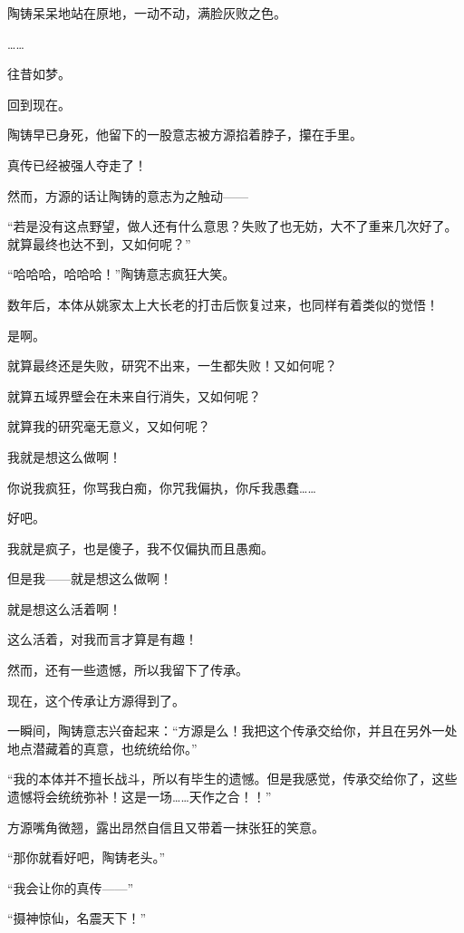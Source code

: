 \begin{this_body}
陶铸呆呆地站在原地，一动不动，满脸灰败之色。

……

往昔如梦。

回到现在。

陶铸早已身死，他留下的一股意志被方源掐着脖子，攥在手里。

真传已经被强人夺走了！

然而，方源的话让陶铸的意志为之触动——

“若是没有这点野望，做人还有什么意思？失败了也无妨，大不了重来几次好了。就算最终也达不到，又如何呢？”

“哈哈哈，哈哈哈！”陶铸意志疯狂大笑。

数年后，本体从姚家太上大长老的打击后恢复过来，也同样有着类似的觉悟！

是啊。

就算最终还是失败，研究不出来，一生都失败！又如何呢？

就算五域界壁会在未来自行消失，又如何呢？

就算我的研究毫无意义，又如何呢？

我就是想这么做啊！

你说我疯狂，你骂我白痴，你咒我偏执，你斥我愚蠢……

好吧。

我就是疯子，也是傻子，我不仅偏执而且愚痴。

但是我——就是想这么做啊！

就是想这么活着啊！

这么活着，对我而言才算是有趣！

然而，还有一些遗憾，所以我留下了传承。

现在，这个传承让方源得到了。

一瞬间，陶铸意志兴奋起来：“方源是么！我把这个传承交给你，并且在另外一处地点潜藏着的真意，也统统给你。”

“我的本体并不擅长战斗，所以有毕生的遗憾。但是我感觉，传承交给你了，这些遗憾将会统统弥补！这是一场……天作之合！！”

方源嘴角微翘，露出昂然自信且又带着一抹张狂的笑意。

“那你就看好吧，陶铸老头。”

“我会让你的真传——”

“摄神惊仙，名震天下！”

\end{this_body}

